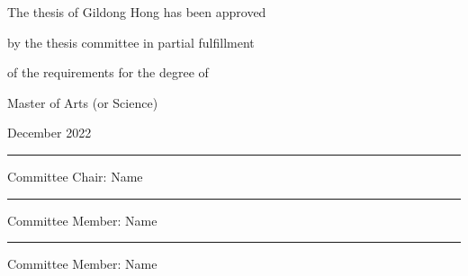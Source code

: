 \documentclass{report}
\begin{document}
\newpage %
\begin{center}
\Large
The thesis of Gildong Hong has been approved \par
by the thesis committee in partial fulfillment\par
of the requirements for the degree of \par
Master of Arts (or Science)  
\par\vspace{1cm}
\large December 2022 %
\par\vspace{3cm}
\rule{.6\textwidth}{0.4pt}\par %
\Large
Committee Chair: Name
\par\vspace{1cm}
\rule{.6\textwidth}{0.4pt}\par %
Committee Member: Name
\par\vspace{1cm}
\rule{.6\textwidth}{0.4pt}\par %
Committee Member: Name 
\end{center}


\end{document}
